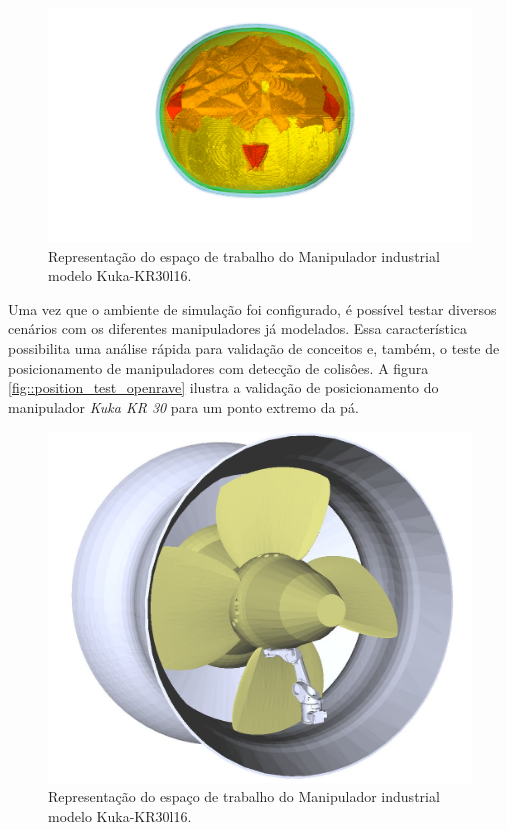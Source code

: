 \begin{figure}[h!]
\centering
	\includegraphics[width=\columnwidth]{figs/openrave/workspace_kr30l16_openrave}
	\caption{Representação do espaço de trabalho do Manipulador industrial
	modelo Kuka-KR30l16.}
	\label{fig::workspace_openrave}
\end{figure}

Uma vez que o ambiente de simulação foi configurado, é possível testar diversos
cenários com os diferentes manipuladores já modelados. Essa característica
possibilita uma análise rápida para validação de conceitos e, também, o teste
de posicionamento de manipuladores com detecção de colisôes. A figura
\ref{fig::position_test_openrave} ilustra a validação de posicionamento do
manipulador \textit{Kuka KR 30} para um ponto extremo da pá. 

\begin{figure}[h!]
\centering
	\includegraphics[width=\columnwidth]{figs/openrave/position_test_openrave}
	\caption{Representação do espaço de trabalho do Manipulador industrial
	modelo Kuka-KR30l16.}
	\label{fig::workspace_openrave}
\end{figure}

